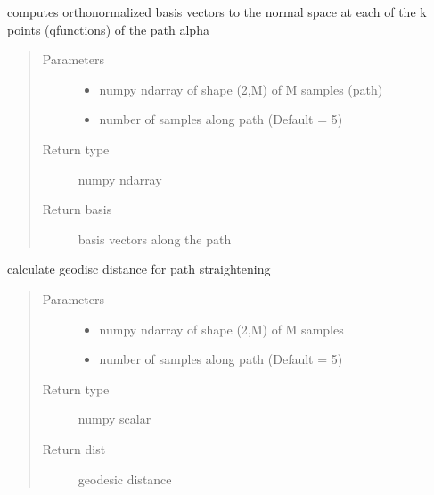 \documentclass[letterpaper,10pt,english]{sphinxmanual}
\begin{document}
\begin{fulllineitems}
\label{\detokenize{geodesic:geodesic.find_basis_normal_path}}
computes orthonormalized basis vectors to the normal space at each of the
k points (q\sphinxhyphen{}functions) of the path alpha
\begin{quote}\begin{description}
\item[{Parameters}] \leavevmode\begin{itemize}
\item {} 
 \textendash{} numpy ndarray of shape (2,M) of M samples (path)

\item {} 
 \textendash{} number of samples along path (Default = 5)

\end{itemize}

\item[{Return type}] \leavevmode
numpy ndarray

\item[{Return basis}] \leavevmode
basis vectors along the path

\end{description}\end{quote}

\end{fulllineitems}


\begin{fulllineitems}
\label{\detokenize{geodesic:geodesic.geod_dist_path_strt}}
calculate geodisc distance for path straightening
\begin{quote}\begin{description}
\item[{Parameters}] \leavevmode\begin{itemize}
\item {} 
 \textendash{} numpy ndarray of shape (2,M) of M samples

\item {} 
 \textendash{} number of samples along path (Default = 5)

\end{itemize}

\item[{Return type}] \leavevmode
numpy scalar

\item[{Return dist}] \leavevmode
geodesic distance

\end{description}\end{quote}

\end{fulllineitems}
\end{document}
